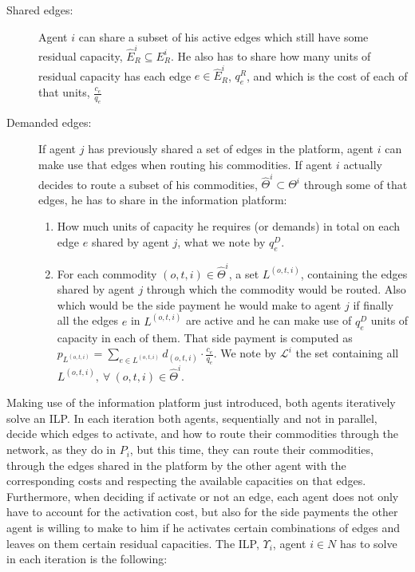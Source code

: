 \documentclass[review]{elsarticle}
\begin{document}
\begin{description}
	\item[Shared edges:] Agent $i$ can share a subset of his active edges which still have some residual capacity, $\widehat{E}_R^i\subseteq E_R^i$. He also has to share how many units of residual capacity has each edge $e\in \widehat{E}_R^i$, $q_e^R$, and which is the cost of each of that units, $\frac{c_e}{q_e}$
	\item[Demanded edges:] If agent $j$ has previously shared a set of edges in the platform, agent $i$ can make use that edges when routing his commodities. If agent $i$ actually decides to route a subset of his commodities, $\widehat{\Theta}^i\subset \Theta ^i$ through some of that edges, he has to share in the information platform:
	\begin{enumerate}
		\item How much units of capacity he requires (or demands) in total on each edge $e$ shared by agent $j$, what we note by $q_e^D$.
	\item For each commodity $(o,t,i)\in \widehat{\Theta}^i$, a set $L^{(o,t,i)}$, containing the edges shared by agent $j$ through which the commodity would be routed. Also which would be the side payment he would make to agent $j$ if finally all the edges $e$ in $L^{(o,t,i)}$ are active and he can make use of $q_e^D$ units of capacity in each of them. That side payment is computed as $p_{L^{(o,t,i)}}=\sum_{e \in L^{(o,t,i)}} d_{(o,t,i)}\cdot \frac{c_e}{q_e}$. We note by $\mathcal{L}^i$ the set containing all $L^{(o,t,i)},\ \forall\ (o,t,i) \in \widehat{\Theta}^i$.
	\end{enumerate}
		
\end{description}	

Making use of the information platform just introduced, both agents iteratively solve an ILP. In each iteration both agents, sequentially and not in parallel, decide which edges to activate, and how to route their commodities through the network, as they do in $P_i$, but this time, they can route their commodities, through the edges shared in the platform by the other agent with the corresponding costs and respecting the available capacities on that edges. Furthermore, when deciding if activate or not an edge, each agent does not only have to account for the activation cost, but also for the side payments the other agent is willing to make to him if he activates certain combinations of edges and leaves on them certain residual capacities. The ILP, $\Upsilon_i$, agent $i\in N$ has to solve in each iteration is the following:
\end{document}
